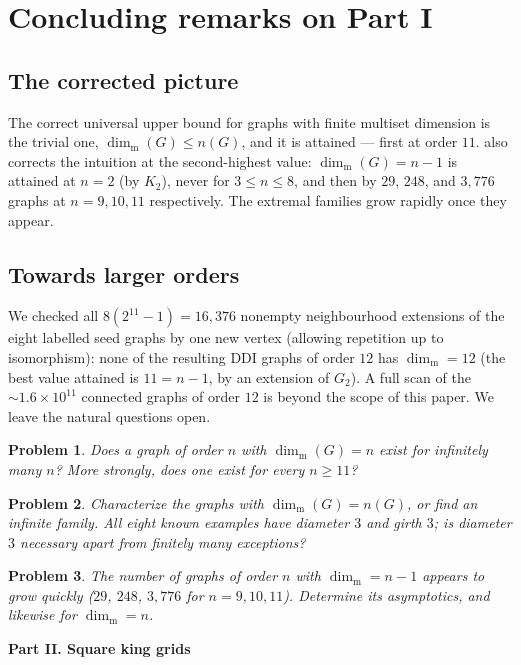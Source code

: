 \documentclass[11pt]{amsart}
\newtheorem{problem}[problem]{Problem}
\theoremstyle{remark}
\newcommand{\mdim}{\operatorname{dim}_{\mathrm m}}
\newcommand{\partheading}[1]{\bigskip\begin{center}{\Large\bfseries #1}\end{center}\medskip}
\begin{document}
\section{Concluding remarks on Part I}\label{sec:remarks}

\subsection{The corrected picture}
The correct universal upper bound for graphs with finite multiset dimension is the trivial one, $\mdim(G)\le n(G)$, and it is attained --- first at order $11$.   also corrects the intuition at the second-highest value: $\mdim(G)=n-1$ is attained at $n=2$ (by $K_2$), never for $3\le n\le 8$, and then by $29$, $248$, and $3{,}776$ graphs at $n=9,10,11$ respectively.  The extremal families grow rapidly once they appear.
\subsection{Towards larger orders}
We checked all $8(2^{11}-1)=16{,}376$ nonempty neighbourhood extensions of the eight labelled seed graphs by one new vertex (allowing repetition up to isomorphism): none of the resulting DDI graphs of order $12$ has $\mdim=12$ (the best value attained is $11=n-1$, by an extension of $G_2$).  A full scan of the $\sim 1.6\times 10^{11}$ connected graphs of order $12$ is beyond the scope of this paper.  We leave the natural questions open.

\begin{problem}\label{prob:all-n}
Does a graph of order $n$ with $\mdim(G)=n$ exist for infinitely many $n$?  More strongly, does one exist for every $n\ge 11$?
\end{problem}

\begin{problem}\label{prob:struct}
Characterize the graphs with $\mdim(G)=n(G)$, or find an infinite family.  All eight known examples have diameter $3$ and girth $3$; is diameter $3$ necessary apart from finitely many exceptions?
\end{problem}

\begin{problem}\label{prob:count}
The number of graphs of order $n$ with $\mdim=n-1$ appears to grow quickly ($29$, $248$, $3{,}776$ for $n=9,10,11$).  Determine its asymptotics, and likewise for $\mdim=n$.
\end{problem}

\partheading{Part II. Square king grids}
\end{document}
